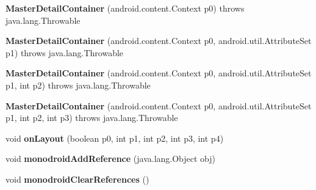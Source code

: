 \begin{DoxyCompactItemize}
\item 
\mbox{\label{classmd5270abb39e60627f0f200893b490a1ade_1_1_master_detail_container_a9807f2073f88d818e7daa1d67838ea41}} 
{\bfseries Master\+Detail\+Container} (android.\+content.\+Context p0)  throws java.\+lang.\+Throwable 	
\item 
\mbox{\label{classmd5270abb39e60627f0f200893b490a1ade_1_1_master_detail_container_ac1707155566739333160760c52523d93}} 
{\bfseries Master\+Detail\+Container} (android.\+content.\+Context p0, android.\+util.\+Attribute\+Set p1)  throws java.\+lang.\+Throwable 	
\item 
\mbox{\label{classmd5270abb39e60627f0f200893b490a1ade_1_1_master_detail_container_afe89442bed68567e1df7fa008310532a}} 
{\bfseries Master\+Detail\+Container} (android.\+content.\+Context p0, android.\+util.\+Attribute\+Set p1, int p2)  throws java.\+lang.\+Throwable 	
\item 
\mbox{\label{classmd5270abb39e60627f0f200893b490a1ade_1_1_master_detail_container_a003d434348891f8f2e731962b72dd90a}} 
{\bfseries Master\+Detail\+Container} (android.\+content.\+Context p0, android.\+util.\+Attribute\+Set p1, int p2, int p3)  throws java.\+lang.\+Throwable 	
\item 
\mbox{\label{classmd5270abb39e60627f0f200893b490a1ade_1_1_master_detail_container_af60c6a5b4b46f56b41eb0cd825f110de}} 
void {\bfseries on\+Layout} (boolean p0, int p1, int p2, int p3, int p4)
\item 
\mbox{\label{classmd5270abb39e60627f0f200893b490a1ade_1_1_master_detail_container_a31845d67e73cb6060fb8228c0a40c8d4}} 
void {\bfseries monodroid\+Add\+Reference} (java.\+lang.\+Object obj)
\item 
\mbox{\label{classmd5270abb39e60627f0f200893b490a1ade_1_1_master_detail_container_a93a5d443fda3e43f134d2522b7230b21}} 
void {\bfseries monodroid\+Clear\+References} ()
\end{DoxyCompactItemize}
